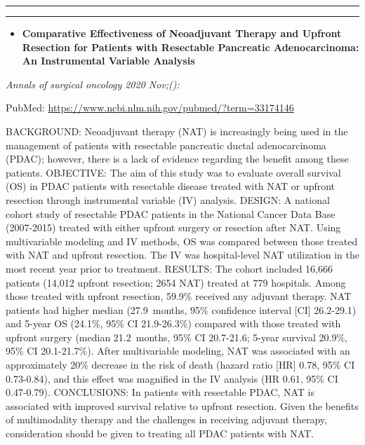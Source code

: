 \documentclass[
]{article}
\providecommand{\tightlist}{%
  \setlength{\itemsep}{0pt}\setlength{\parskip}{0pt}}
\begin{document}
\begin{center}\rule{0.5\linewidth}{0.5pt}\end{center}

\begin{center}\rule{0.5\linewidth}{0.5pt}\end{center}

\begin{itemize}
\tightlist
\item
  \textbf{Comparative Effectiveness of Neoadjuvant Therapy and Upfront
  Resection for Patients with Resectable Pancreatic Adenocarcinoma: An
  Instrumental Variable Analysis}
\end{itemize}

\emph{Annals of surgical oncology 2020 Nov;():}

PubMed: \url{https://www.ncbi.nlm.nih.gov/pubmed/?term=33174146}

BACKGROUND: Neoadjuvant therapy (NAT) is increasingly being used in the
management of patients with resectable pancreatic ductal adenocarcinoma
(PDAC); however, there is a lack of evidence regarding the benefit among
these patients. OBJECTIVE: The aim of this study was to evaluate overall
survival (OS) in PDAC patients with resectable disease treated with NAT
or upfront resection through instrumental variable (IV) analysis.
DESIGN: A national cohort study of resectable PDAC patients in the
National Cancer Data Base (2007-2015) treated with either upfront
surgery or resection after NAT. Using multivariable modeling and IV
methods, OS was compared between those treated with NAT and upfront
resection. The IV was hospital-level NAT utilization in the most recent
year prior to treatment. RESULTS: The cohort included 16,666 patients
(14,012 upfront resection; 2654 NAT) treated at 779 hospitals. Among
those treated with upfront resection, 59.9\% received any adjuvant
therapy. NAT patients had higher median (27.9~months, 95\% confidence
interval {[}CI{]} 26.2-29.1) and 5-year OS (24.1\%, 95\% CI 21.9-26.3\%)
compared with those treated with upfront surgery (median 21.2~months,
95\% CI 20.7-21.6; 5-year survival 20.9\%, 95\% CI 20.1-21.7\%). After
multivariable modeling, NAT was associated with an approximately 20\%
decrease in the risk of death (hazard ratio {[}HR{]} 0.78, 95\% CI
0.73-0.84), and this effect was magnified in the IV analysis (HR 0.61,
95\% CI 0.47-0.79). CONCLUSIONS: In patients with resectable PDAC, NAT
is associated with improved survival relative to upfront resection.
Given the benefits of multimodality therapy and the challenges in
receiving adjuvant therapy, consideration should be given to treating
all PDAC patients with NAT.
\end{document}

